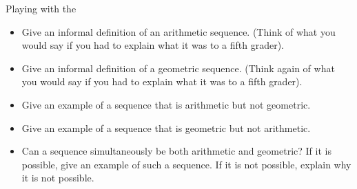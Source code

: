 \begin{exercise}{Playing with the  \Coffeecup \Coffeecup}
\begin{itemize}
\item Give an informal definition of an arithmetic sequence.  (Think of what you would say if you had to explain what it was to a fifth grader). 


\item Give an informal definition of a geometric sequence.  (Think again of what you would say if you had to explain what it was to a fifth grader). 


\item Give an example of a sequence that is arithmetic but not geometric.

\item Give an example of a sequence that is geometric but not arithmetic.

\item Can a sequence simultaneously be both arithmetic and geometric?  If it is possible, give an example of such a sequence.  If it is not possible, explain why it is not possible.

\end{itemize}
\end{exercise}

